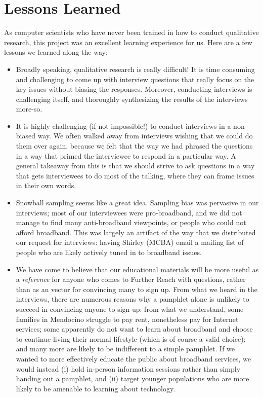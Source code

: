 \section{Lessons Learned}
\label{sec:lessons}

As computer scientists who have never been trained in how to conduct qualitative
research, this project was an excellent learning
experience for us. Here are a few lessons we learned along the way:

\begin{itemize}
\item Broadly speaking, qualitative research is really difficult! It is time
consuming and challenging to come up with interview questions that really
focus on the key issues without biasing the responses. Moreover, conducting
interviews is challenging itself, and thoroughly synthesizing the results of
the interviews more-so.
\item It is highly challenging (if not impossible!) to conduct interviews in a
non-biased way. We often walked away from interviews wishing that we could do
them over again, because we felt that the way we had phrased the questions in
a way that primed the interviewee to respond in a particular way. A general
takeaway from this is that we should strive to ask questions in a way that
gets interviewees to do most of the talking, where they can frame issues in
their own words.
\item Snowball sampling seems like a great idea. Sampling bias was pervasive in our interviews; most of our
interviewees were pro-broadband, and we did not manage to find many
anti-broadband viewpoints,
or people who could not afford broadband. This was largely an artifact of the
way that we distributed our request for interviews: having Shirley (MCBA)
email a mailing list of people who are likely actively tuned in to broadband issues.
\item We have come to believe that our educational materials will be more
useful as a {\em reference} for anyone who comes to Further Reach with
questions, rather than as an vector for convincing many to sign up. From
what we heard in the interviews, there
are numerous reasons why a pamphlet alone is unlikely to succeed in convincing
anyone to sign up: from what we understand, some families in Mendocino
struggle to pay rent, nonetheless
pay for Internet services; some apparently do not want to learn about broadband
and choose to continue living their normal lifestyle (which is of course a
valid choice);
and many more are likely to be indifferent to a simple pamphlet. If we wanted to more effectively
educate the public about broadband services, we would instead (i) hold
in-person information sessions rather than simply handing out a pamphlet, and
(ii) target younger populations who are more likely to be amenable to learning
about technology.
\end{itemize}

